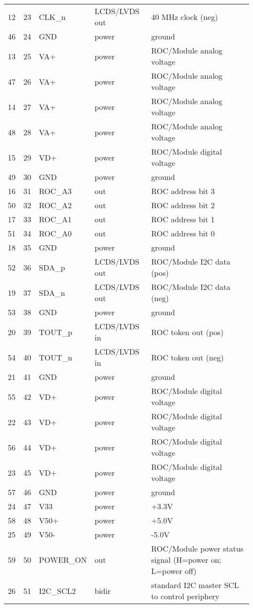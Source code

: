 \begin{table}[p]
{\begin{tabular}{cclll}
12 & 23 & CLK\_n & LCDS/LVDS out & 40 MHz clock (neg) \\ 
46 & 24 & GND & power & ground \\ 
13 & 25 & VA+ & power & ROC/Module analog voltage \\ 
47 & 26 & VA+ & power & ROC/Module analog voltage \\ 
14 & 27 & VA+ & power & ROC/Module analog voltage \\ 
48 & 28 & VA+ & power & ROC/Module analog voltage \\ 
15 & 29 & VD+ & power & ROC/Module digital voltage \\ 
49 & 30 & GND & power & ground \\ 
16 & 31 & ROC\_A3 & out & ROC address bit 3 \\ 
50 & 32 & ROC\_A2 & out & ROC address bit 2 \\ 
17 & 33 & ROC\_A1 & out & ROC address bit 1 \\ 
51 & 34 & ROC\_A0 & out & ROC address bit 0 \\ 
18 & 35 & GND & power & ground \\ 
52 & 36 & SDA\_p & LCDS/LVDS out & ROC/Module I2C data (pos) \\ 
19 & 37 & SDA\_n & LCDS/LVDS out & ROC/Module I2C data (neg) \\ 
53 & 38 & GND & power & ground \\ 
20 & 39 & TOUT\_p & LCDS/LVDS in & ROC token out (pos) \\ 
54 & 40 & TOUT\_n & LCDS/LVDS in & ROC token out (neg) \\ 
21 & 41 & GND & power & ground \\ 
55 & 42 & VD+ & power & ROC/Module digital voltage \\ 
22 & 43 & VD+ & power & ROC/Module digital voltage \\ 
56 & 44 & VD+ & power & ROC/Module digital voltage \\ 
23 & 45 & VD+ & power & ROC/Module digital voltage \\ 
57 & 46 & GND & power & ground \\ 
24 & 47 & V33 & power & +3.3V \\ 
58 & 48 & V50+ & power & +5.0V \\ 
25 & 49 & V50- & power & -5.0V \\ 
59 & 50 & POWER\_ON & out & ROC/Module power status signal (H=power on; L=power off) \\ 
26 & 51 & I2C\_SCL2 & bidir & standard I2C master SCL to control periphery \\ 

\end{tabular}}
\end{table}
